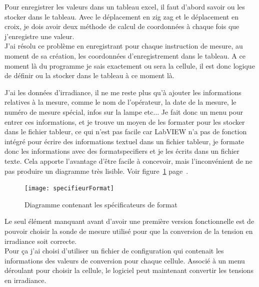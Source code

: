 \documentclass[12pt]{article}
\begin{document}
Pour enregistrer les valeurs dans un tableau excel, il faut d'abord savoir ou les stocker dans le tableau.
Avec le déplacement en zig zag et le déplacement en croix, je dois avoir deux méthode de calcul de coordonnées à chaque fois que j'enregistre une valeur.\\
J'ai résolu ce problème en enregistrant pour chaque instruction de mesure, au moment de sa création, les coordonnées d'enregistrement dans le tableau.
A ce moment là du programme je sais exactement ou sera la cellule, il est donc logique de définir ou la stocker dans le tableau à ce moment là.


J'ai les données d'irradiance, il ne me reste plus qu'à ajouter les informations relatives à la mesure, comme le nom de l'opérateur, la date de la mesure, le numéro de mesure spécial, infos sur la lampe etc...
Je fait donc un menu pour entrer ces informations, et je trouve un moyen de les formater pour les stocker dans le fichier tableur, ce qui n'est pas facile car LabVIEW n'a pas de fonction intégré pour écrire des informations textuel dans un fichier tableur, je formate donc les informations avec des \glspl{formatspecifier} et je les écrits dans un fichier texte.
Cela apporte l'avantage d'être facile à concevoir, mais l'inconvénient de ne pas produire un diagramme très lisible.
Voir figure~\ref{fig:specifieurFormat} page~\pageref{fig:specifieurFormat}.

\begin{figure}[h]
	\centering
	\texttt{[image: specifieurFormat]}
	\caption{Diagramme contenant les spécificateurs de format}
	\label{fig:specifieurFormat}
\end{figure}

Le seul élément manquant avant d'avoir une première version fonctionnelle est de pouvoir choisir la sonde de mesure utilisé pour que la conversion de la tension en irradiance soit correcte.\\
Pour ça j'ai choisi d'utiliser un fichier de configuration qui contenait les informations des valeurs de conversion pour chaque cellule. Associé à un menu déroulant pour choisir la cellule, le logiciel peut maintenant convertir les tensions en irradiance.
\end{document}
